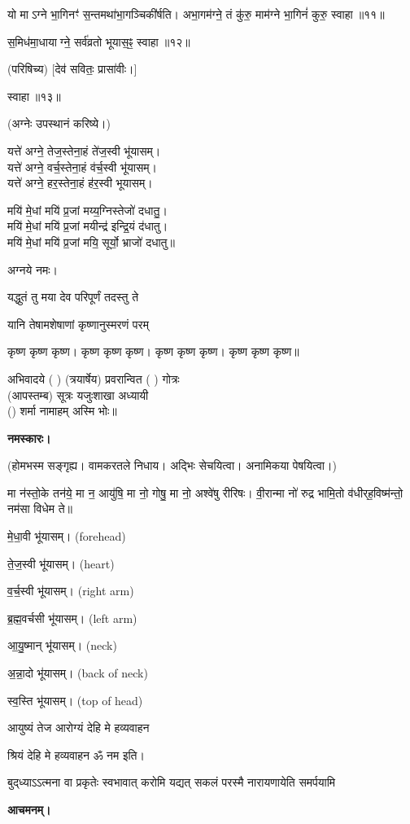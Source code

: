 यो माऽग्ने भा॒गिनꣳ॑ स॒न्तमथा॑भा॒गञ्चिकी॑र्\mbox{}षति। अभा॒गम॑ग्ने॒ तं कु॑रु॒ माम॑ग्ने भा॒गिनं॑ कुरु॒ स्वाहा॥११॥

स॒मिध॑मा॒धायाग्ने॒ सर्व॑व्रतो भूयास॒ꣴ॒ स्वाहा॥१२॥

(परिषिच्य) [देव॑ सवितः॒ प्रासा॑वीः।]

स्वाहा॥१३॥


(अग्नेः उपस्थानं करिष्ये।)

यत्ते॑ अग्ने॒ तेज॒स्तेना॒हं ते॑ज॒स्वी भू॑यासम्।\\
यत्ते॑ अग्ने॒ वर्च॒स्तेना॒हं व॑र्च॒स्वी भू॑यासम्।\\
यत्ते॑ अग्ने॒ हर॒स्तेना॒हं ह॑र॒स्वी भूयासम्।

मयि॑ मे॒धां मयि॑ प्र॒जां मय्य॒ग्निस्तेजो॑ दधातु॒।\\
मयि॑ मे॒धां मयि॑ प्र॒जां मयीन्द्र॑ इन्द्रि॒यं द॑धातु।\\
मयि॑ मे॒धां मयि॑ प्र॒जां मयि॒ सूर्यो॒ भ्राजो॑ दधातु॥
 
अग्नये नमः। 

{यद्धुतं तु मया देव परिपूर्णं तदस्तु ते}

{यानि तेषामशेषाणां कृष्णानुस्मरणं परम्}

कृष्ण कृष्ण कृष्ण। कृष्ण कृष्ण कृष्ण। कृष्ण कृष्ण कृष्ण। कृष्ण कृष्ण कृष्ण॥

अभिवादये ( ) (त्रयार्षेय) प्रवरान्वित ( ) गोत्रः\\
(आपस्तम्ब) सूत्रः यजुःशाखा अध्यायी\\
() शर्मा नामाहम् अस्मि भोः॥

\textbf{नमस्कारः।}



(होमभस्म सङ्गृह्य। वामकरतले निधाय। अद्भिः सेचयित्वा। अनामिकया पेषयित्वा।)

 मा न॑स्तो॒के तन॑ये॒ मा न॒ आयु॑षि॒ मा नो॒ गोषु॒ मा नो॒ अश्वे॑षु रीरिषः। वी॒रान्मा नो॑ रुद्र भामि॒तो व॑धीर्‌ह॒विष्म॑न्तो॒ नम॑सा विधेम ते॥
 
 मे॒धा॒वी भू॑यासम्। (forehead)
 
 ते॒ज॒स्वी भू॑यासम्। (heart)
 
 व॒र्च॒स्वी भू॑यासम्। (right arm)
 
 ब्र॒ह्म॒वर्चसी भू॑यासम्। (left arm)
 
 आ॒यु॒ष्मान् भू॑यासम्। (neck)
 
 अ॒न्ना॒दो भू॑यासम्। (back of neck)
 
 स्व॒स्ति भू॑यासम्। (top of head)
 
 
{आयुष्यं तेज आरोग्यं देहि मे हव्यवाहन}
 
श्रियं देहि मे हव्यवाहन ॐ नम इति।

{बुद्‌ध्याऽऽत्मना वा प्रकृतेः स्वभावात्}
{करोमि यद्यत् सकलं परस्मै}
{नारायणायेति समर्पयामि}

\textbf{आचमनम्।}


 